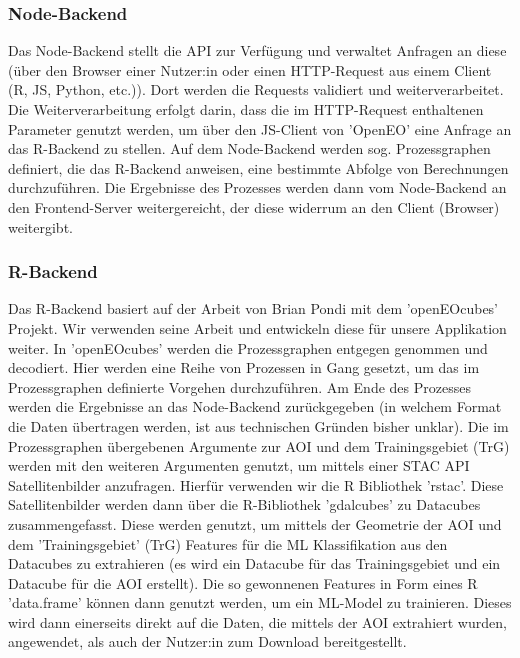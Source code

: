\documentclass[a4paper,12pt]{article}
\begin{document}
\subsubsection{Node-Backend}
Das Node-Backend stellt die API zur Verfügung und verwaltet Anfragen an diese (über den Browser einer Nutzer:in oder einen HTTP-Request aus einem Client (R, JS, Python, etc.)). Dort werden die Requests validiert und weiterverarbeitet. Die Weiterverarbeitung erfolgt darin, dass die im HTTP-Request enthaltenen Parameter genutzt werden, um über den JS-Client von 'OpenEO' eine Anfrage an das R-Backend zu stellen. Auf dem Node-Backend werden sog. Prozessgraphen definiert, die das R-Backend anweisen, eine bestimmte Abfolge von Berechnungen durchzuführen. Die Ergebnisse des Prozesses werden dann vom Node-Backend an den Frontend-Server weitergereicht, der diese widerrum an den Client (Browser) weitergibt.


\subsubsection{R-Backend}
Das R-Backend basiert auf der Arbeit von Brian Pondi mit dem 'openEOcubes' Projekt. Wir verwenden seine Arbeit und entwickeln diese für unsere Applikation weiter.
In 'openEOcubes' werden die Prozessgraphen entgegen genommen und decodiert. Hier werden eine Reihe von Prozessen in Gang gesetzt, um das im Prozessgraphen definierte Vorgehen durchzuführen. Am Ende des Prozesses werden die Ergebnisse an das Node-Backend zurückgegeben (in welchem Format die Daten übertragen werden, ist aus technischen Gründen bisher unklar).
Die im Prozessgraphen übergebenen Argumente zur AOI und dem Trainingsgebiet (TrG) werden mit den weiteren Argumenten genutzt, um mittels einer STAC API Satellitenbilder anzufragen. Hierfür verwenden wir die R Bibliothek 'rstac'. Diese Satellitenbilder werden dann über die R-Bibliothek 'gdalcubes' zu Datacubes zusammengefasst. Diese werden genutzt, um mittels der Geometrie der AOI und dem 'Trainingsgebiet' (TrG) Features für die  ML Klassifikation aus den Datacubes zu extrahieren (es wird ein Datacube für das Trainingsgebiet und ein Datacube für die AOI erstellt).
Die so gewonnenen Features in Form eines R 'data.frame' können dann genutzt werden, um ein ML-Model zu trainieren. Dieses wird dann einerseits direkt auf die Daten, die mittels der AOI extrahiert wurden, angewendet, als auch der Nutzer:in zum Download bereitgestellt.
\end{document}
